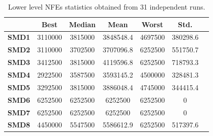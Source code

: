 \documentclass[conference]{IEEEtran}
\begin{document}
\begin{table}[!ht]
\renewcommand{\arraystretch}{1.3}
    \caption{Lower level NFEs statistics obtained from 31 independent runs.}
    \label{tab:ll-fes}
    \centering
    \begin{tabular}{|c|c|c|c|c|c|c|}
\hline
&\textbf{Best}&\textbf{Median}&\textbf{Mean}&\textbf{Worst}&\textbf{Std.}\\ \hline 
\textbf{SMD1} & 3110000  & 3815000  & 3848548.4  & 4697500  & 380298.6 \\ \hline
\textbf{SMD2} & 3110000  & 3702500  & 3707096.8  & 6252500  & 551750.7 \\ \hline
\textbf{SMD3} & 3412500  & 3815000  & 4119596.8  & 6252500  & 718793.3 \\ \hline
\textbf{SMD4} & 2922500  & 3587500  & 3593145.2  & 4500000  & 328481.3 \\ \hline
\textbf{SMD5} & 3292500  & 3815000  & 3886048.4  & 4745000  & 344415.4 \\ \hline
\textbf{SMD6} & 6252500  & 6252500  & 6252500  & 6252500  & 0 \\ \hline
\textbf{SMD7} & 6252500  & 6252500  & 6252500  & 6252500  & 0 \\ \hline
\textbf{SMD8} & 4450000  & 5547500  & 5586612.9  & 6252500  & 517397.6 \\ \hline
    \end{tabular}
\end{table}

\end{document}
